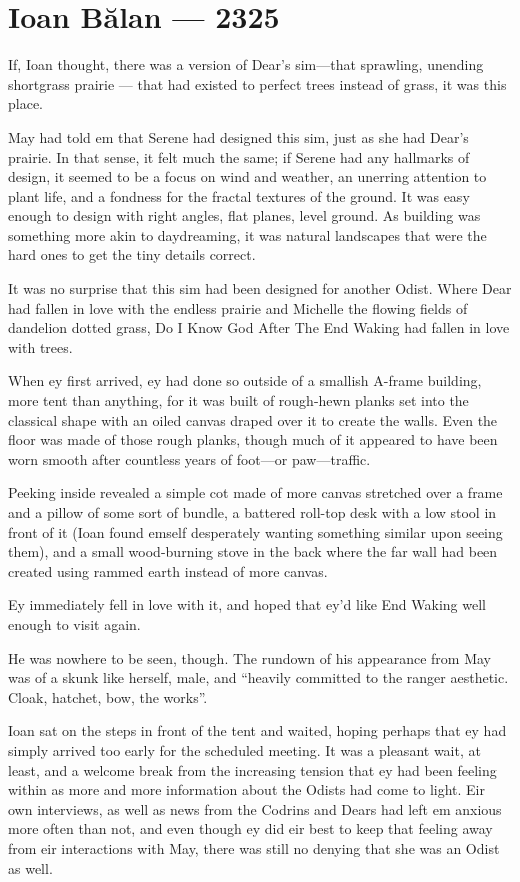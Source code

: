 \hypertarget{ioan-bux103lan-2325}{%
\chapter{Ioan Bălan — 2325}\label{ioan-bux103lan-2325}}

If, Ioan thought, there was a version of Dear's sim---that sprawling, unending shortgrass prairie — that had existed to perfect trees instead of grass, it was this place.

May had told em that Serene had designed this sim, just as she had Dear's prairie. In that sense, it felt much the same; if Serene had any hallmarks of design, it seemed to be a focus on wind and weather, an unerring attention to plant life, and a fondness for the fractal textures of the ground. It was easy enough to design with right angles, flat planes, level ground. As building was something more akin to daydreaming, it was natural landscapes that were the hard ones to get the tiny details correct.

It was no surprise that this sim had been designed for another Odist. Where Dear had fallen in love with the endless prairie and Michelle the flowing fields of dandelion dotted grass, Do I Know God After The End Waking had fallen in love with trees.

When ey first arrived, ey had done so outside of a smallish A-frame building, more tent than anything, for it was built of rough-hewn planks set into the classical shape with an oiled canvas draped over it to create the walls. Even the floor was made of those rough planks, though much of it appeared to have been worn smooth after countless years of foot---or paw---traffic.

Peeking inside revealed a simple cot made of more canvas stretched over a frame and a pillow of some sort of bundle, a battered roll-top desk with a low stool in front of it (Ioan found emself desperately wanting something similar upon seeing them), and a small wood-burning stove in the back where the far wall had been created using rammed earth instead of more canvas.

Ey immediately fell in love with it, and hoped that ey'd like End Waking well enough to visit again.

He was nowhere to be seen, though. The rundown of his appearance from May was of a skunk like herself, male, and ``heavily committed to the ranger aesthetic. Cloak, hatchet, bow, the works''.

Ioan sat on the steps in front of the tent and waited, hoping perhaps that ey had simply arrived too early for the scheduled meeting. It was a pleasant wait, at least, and a welcome break from the increasing tension that ey had been feeling within as more and more information about the Odists had come to light. Eir own interviews, as well as news from the Codrins and Dears had left em anxious more often than not, and even though ey did eir best to keep that feeling away from eir interactions with May, there was still no denying that she was an Odist as well.

